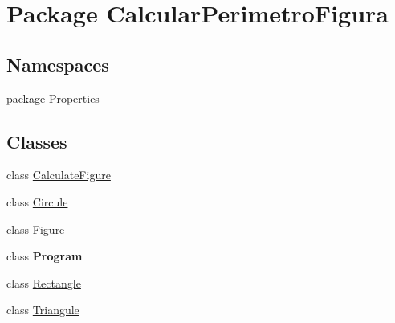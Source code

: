 \hypertarget{namespace_calcular_perimetro_figura}{}\section{Package Calcular\+Perimetro\+Figura}
\label{namespace_calcular_perimetro_figura}
\subsection*{Namespaces}
\begin{DoxyCompactItemize}
\item 
package \hyperlink{namespace_calcular_perimetro_figura_1_1_properties}{Properties}
\end{DoxyCompactItemize}
\subsection*{Classes}
\begin{DoxyCompactItemize}
\item 
class \hyperlink{class_calcular_perimetro_figura_1_1_calculate_figure}{Calculate\+Figure}
\item 
class \hyperlink{class_calcular_perimetro_figura_1_1_circule}{Circule}
\item 
class \hyperlink{class_calcular_perimetro_figura_1_1_figure}{Figure}
\item 
class {\bfseries Program}
\item 
class \hyperlink{class_calcular_perimetro_figura_1_1_rectangle}{Rectangle}
\item 
class \hyperlink{class_calcular_perimetro_figura_1_1_triangule}{Triangule}
\end{DoxyCompactItemize}
